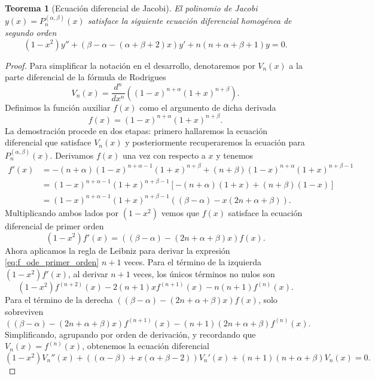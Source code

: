 \documentclass[12pt,a4paper]{book}
\newtheorem{theorem}{Teorema}
\begin{document}
\begin{theorem}[Ecuación diferencial de Jacobi]
\label{teo:edo_jacobi}
El polinomio de Jacobi $y(x) = P_n^{(\alpha, \beta)}(x)$ satisface la siguiente ecuación diferencial homogénea de segundo orden
\begin{equation*}
    (1-x^2)y'' + (\beta - \alpha - (\alpha + \beta + 2)x)y' + n(n + \alpha + \beta + 1)y = 0.
\end{equation*}
\end{theorem}

\begin{proof}
Para simplificar la notación en el desarrollo, denotaremos por $V_n(x)$ a la parte diferencial de la fórmula de Rodrigues
\[
V_n(x) = \frac{d^n}{dx^n} ((1-x)^{n+\alpha} (1+x)^{n+\beta}).
\]
Definimos la función auxiliar $f(x)$ como el argumento de dicha derivada
\[
f(x) = (1-x)^{n+\alpha} (1+x)^{n+\beta}.
\]
La demostración procede en dos etapas: primero hallaremos la ecuación diferencial que satisface $V_n(x)$ y posteriormente recuperaremos la ecuación para $P_n^{(\alpha, \beta)}(x)$.
Derivamos $f(x)$ una vez con respecto a $x$ y tenemos
\begin{align*}
    f'(x) &=
    -(n+\alpha)(1-x)^{n+\alpha-1}(1+x)^{n+\beta} + (n+\beta)(1-x)^{n+\alpha}(1+x)^{n+\beta-1} \\ 
    &= (1-x)^{n+\alpha-1}(1+x)^{n+\beta-1} \left[ -(n+\alpha)(1+x) + (n+\beta)(1-x) \right] \\ 
    &= (1-x)^{n+\alpha-1}(1+x)^{n+\beta-1} ((\beta - \alpha) - x(2n + \alpha + \beta)).
\end{align*}
Multiplicando ambos lados por $(1-x^2)$ vemos que $f(x)$ satisface la ecuación diferencial de primer orden
\begin{equation}
\label{eq:f_ode_primer_orden}
    (1-x^2)f'(x) = ((\beta - \alpha) - (2n + \alpha + \beta)x)f(x).   
\end{equation}
Ahora aplicamos la regla de Leibniz para derivar la expresión \eqref{eq:f_ode_primer_orden} $n+1$ veces. Para el término de la izquierda $(1-x^2)f'(x)$, al derivar $n+1$ veces, los únicos términos no nulos son
    \[
     (1-x^2)f^{(n+2)}(x) -2(n+1)xf^{(n+1)}(x) - n(n+1)f^{(n)}(x).
    \]
Para el término de la derecha $((\beta - \alpha) - (2n + \alpha + \beta)x)f(x)$, solo sobreviven 
    \[
    ((\beta - \alpha) - (2n + \alpha + \beta)x)f^{(n+1)}(x) - (n+1)(2n + \alpha + \beta)f^{(n)}(x).
    \]
Simplificando, agrupando por orden de derivación, y recordando que $V_n(x) = f^{(n)}(x)$, obtenemos la ecuación diferencial
\[
(1-x^2)V_n''(x) + ((\alpha - \beta) + x(\alpha + \beta - 2))V_n'(x) + (n+1)(n + \alpha + \beta)V_n(x) = 0.
\]
\end{proof}
\end{document}
